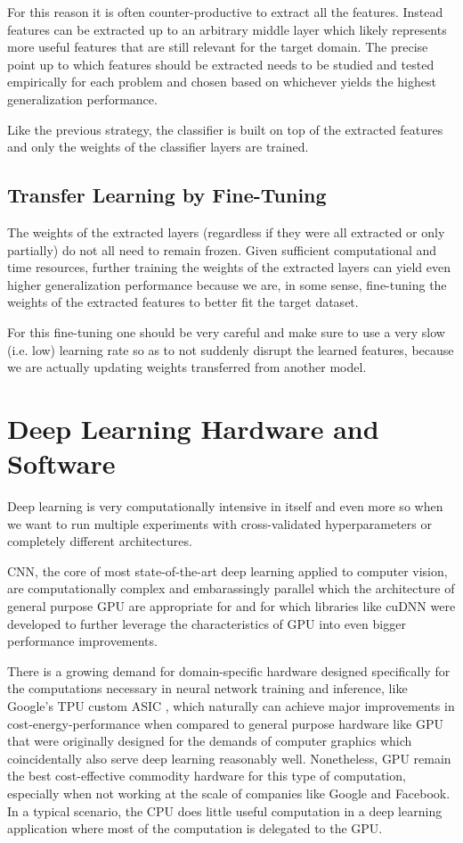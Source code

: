 For this reason it is often counter-productive to extract all the features. Instead features can be extracted up to an arbitrary middle layer which likely represents more useful features that are still relevant for the target domain. The precise point up to which features should be extracted needs to be studied and tested empirically for each problem and chosen based on whichever yields the highest generalization performance.

Like the previous strategy, the classifier is built on top of the extracted features and only the weights of the classifier layers are trained.

\subsection{Transfer Learning by Fine-Tuning}

The weights of the extracted layers (regardless if they were all extracted or only partially) do not all need to remain frozen. Given sufficient computational and time resources, further training the weights of the extracted layers can yield even higher generalization performance because we are, in some sense, fine-tuning the weights of the extracted features to better fit the target dataset.

For this fine-tuning one should be very careful and make sure to use a very slow (i.e. low) learning rate so as to not suddenly disrupt the learned features, because we are actually updating weights transferred from another model.

\section{Deep Learning Hardware and Software}

Deep learning is very computationally intensive in itself and even more so when we want to run multiple experiments with cross-validated hyperparameters or completely different architectures.

\ac{CNN}, the core of most state-of-the-art deep learning applied to computer vision, are computationally complex and embarassingly parallel \cite{chang2017} which the architecture of general purpose \ac{GPU} are appropriate for \cite{gpu} and for which libraries like cuDNN \cite{cudnn} were developed to further leverage the characteristics of \ac{GPU} into even bigger performance improvements.

There is a growing demand for domain-specific hardware designed specifically for the computations necessary in neural network training and inference, like Google's TPU custom ASIC \cite{tpu}, which naturally can achieve major improvements in cost-energy-performance when compared to general purpose hardware like \ac{GPU} that were originally designed for the demands of computer graphics which coincidentally also serve deep learning reasonably well. Nonetheless, \ac{GPU} remain the best cost-effective commodity hardware for this type of computation, especially when not working at the scale of companies like Google and Facebook. In a typical scenario, the CPU does little useful computation in a deep learning application where most of the computation is delegated to the GPU.

